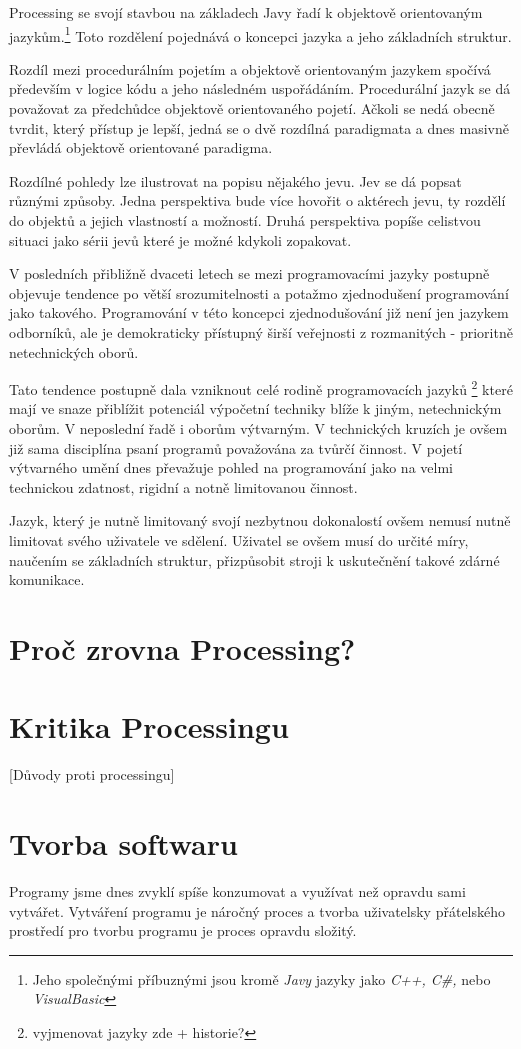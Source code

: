 \documentclass[12pt,twopage]{book}
\newcommand{\oddil}[1]{\section{#1}\label{sec:#1}}
\begin{document}
Processing se svojí stavbou na základech Javy řadí k objektově orientovaným jazykům.\footnote{ Jeho společnými příbuznými jsou kromě {\em Javy} jazyky jako {\em C++, C\#,} nebo {\em VisualBasic}} Toto rozdělení pojednává o koncepci jazyka a jeho základních struktur. 

Rozdíl mezi procedurálním pojetím a objektově orientovaným jazykem spočívá především v logice kódu a jeho následném uspořádáním. Procedurální jazyk se dá považovat za předchůdce objektově orientovaného pojetí. Ačkoli se nedá obecně tvrdit, který přístup je lepší, jedná se o dvě rozdílná paradigmata a dnes masivně převládá objektově orientované paradigma.

Rozdílné pohledy lze ilustrovat na popisu nějakého jevu. Jev se dá popsat různými způsoby. Jedna perspektiva bude více hovořit o aktérech jevu, ty rozdělí do objektů a jejich vlastností a možností. Druhá perspektiva popíše celistvou situaci jako sérii jevů které je možné kdykoli zopakovat.


V posledních přibližně dvaceti letech se mezi programovacími jazyky postupně objevuje tendence po větší srozumitelnosti a potažmo zjednodušení programování jako takového. Programování v této koncepci zjednodušování již není jen jazykem odborníků, ale je demokraticky přístupný širší veřejnosti z rozmanitých - prioritně netechnických oborů.

Tato tendence postupně dala vzniknout celé rodině programovacích jazyků
\footnote{vyjmenovat jazyky zde + historie?}
které mají ve snaze přiblížit potenciál výpočetní techniky blíže k jiným, netechnickým oborům. V neposlední řadě i oborům výtvarným. V technických kruzích je ovšem již sama disciplína psaní programů považována za tvůrčí činnost. V pojetí výtvarného umění dnes převažuje pohled na programování jako na velmi technickou zdatnost, rigidní a notně limitovanou činnost.

Jazyk, který je nutně limitovaný svojí nezbytnou dokonalostí ovšem nemusí nutně limitovat svého uživatele ve sdělení. Uživatel se ovšem musí do určité míry, naučením se základních struktur, přizpůsobit stroji k uskutečnění takové zdárné komunikace.


\oddil{Proč zrovna Processing?}

\oddil{Kritika Processingu}

[Důvody proti processingu]

\oddil{Tvorba softwaru}

Programy jsme dnes zvyklí spíše konzumovat a využívat než opravdu sami vytvářet. Vytváření programu je náročný proces a tvorba uživatelsky přátelského prostředí pro tvorbu programu je proces opravdu složitý.
\end{document}
